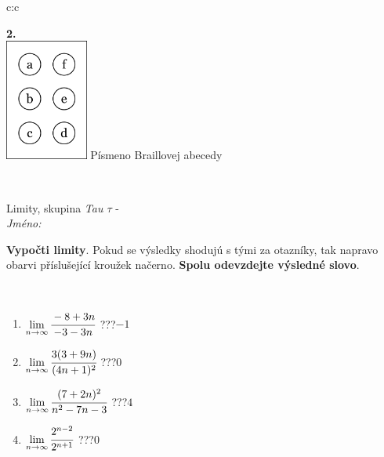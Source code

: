 \documentclass[10pt]{report}
\begin{document}
\begin{tabular}{c:c}
\begin{minipage}[c][104.5mm][t]{0.5\linewidth}
\begin{center}
\begin{minipage}{0.20\linewidth}
\begin{center}
{\Huge\bfseries 2.} \\[2mm]
\includegraphics[height=40mm]{../images/braille.png}
{\small Písmeno Braillovej abecedy}
\end{center}
\end{minipage}
\end{center}
\end{minipage}
\\ \hdashline
\begin{minipage}[c][104.5mm][t]{0.5\linewidth}
\begin{center}
\vspace{7mm}
{\huge Limity, skupina \textit{Tau $\tau$} -}\\[5mm]
\textit{Jméno:}\phantom{xxxxxxxxxxxxxxxxxxxxxxxxxxxxxxxxxxxxxxxxxxxxxxxxxxxxxxxxxxxxxxxxx}\\[5mm]
\begin{minipage}{0.95\linewidth}
\begin{center}
\textbf{Vypočti limity}. Pokud se výsledky shodujú s tými za otazníky, tak napravo\\obarvi příslušející kroužek načerno. \textbf{Spolu odevzdejte výsledné slovo}.
\end{center}
\end{minipage}
\\[1mm]
\begin{minipage}{0.79\linewidth}
\begin{center}
\begin{varwidth}{\linewidth}
\begin{enumerate}
\normalsize
\item $\lim\limits_{n\to\infty}\cfrac{-8+3n}{-3-3n}$\quad \dotfill\; ???\;\dotfill \quad $-1$
\item $\lim\limits_{n\to\infty}\cfrac{3(3+9n)}{(4n+1)^2}$\quad \dotfill\; ???\;\dotfill \quad $0$
\item $\lim\limits_{n\to\infty}\cfrac{(7+2n)^2}{n^2-7n-3}$\quad \dotfill\; ???\;\dotfill \quad $4$
\item $\lim\limits_{n\to\infty}\cfrac{2^{n-2}}{2^{n+1}}$\quad \dotfill\; ???\;\dotfill \quad $0$

\end{enumerate}
\end{varwidth}
\end{center}
\end{minipage}
\end{center}
\end{minipage}
\end{tabular}
\end{document}
